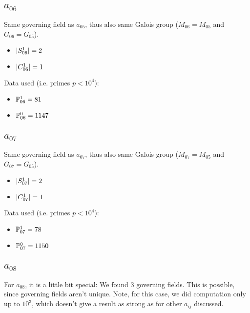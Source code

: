 \subsection{{\huge $a_{06}$}}
Same governing field as $a_{05}$, thus also same Galois group ($M_{06} = M_{05}$ and $G_{06} = G_{05}$).
\begin{itemize}
	\item $| S_{06}^1 | = 2$
	\item $| C_{06}^1 | = 1$
\end{itemize}
Data used (i.e. primes $p<10^4$):
\begin{itemize}
	\item $\mathbb{P}_{06}^1 = 81$
	\item $\mathbb{P}_{06}^0 = 1147$
\end{itemize}
\subsection{{\huge $a_{07}$}}
Same governing field as $a_{07}$, thus also same Galois group ($M_{07} = M_{05}$ and $G_{07} = G_{05}$).
\begin{itemize}
	\item $| S_{07}^1 | = 2$
	\item $| C_{07}^1 | = 1$
\end{itemize}
Data used (i.e. primes $p<10^4$):
\begin{itemize}
	\item $\mathbb{P}_{07}^1 = 78$
	\item $\mathbb{P}_{07}^0 = 1150$
\end{itemize}
\subsection{{\huge $a_{08}$}}
For $a_{08}$, it is a little bit special: We found 3 governing fields.
This is possible, since governing fields aren't unique.
Note, for this case, we did computation only up to $10^3$, which doesn't give a result as strong as for other $a_{ij}$ discussed.

